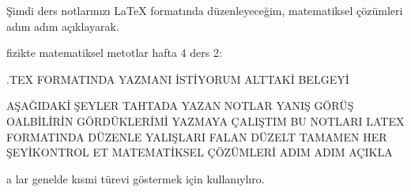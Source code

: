 Şimdi ders notlarınızı LaTeX formatında düzenleyeceğim, matematiksel çözümleri adım adım açıklayarak.


fizikte matematiksel metotlar hafta 4 ders 2:

.TEX FORMATINDA YAZMANI İSTİYORUM ALTTAKİ BELGEYİ

AŞAĞIDAKİ ŞEYLER TAHTADA YAZAN NOTLAR YANIŞ GÖRÜŞ OALBİLİRİN GÖRDÜKLERİMİ YAZMAYA ÇALIŞTIM
BU NOTLARI LATEX FORMATINDA DÜZENLE YALIŞLARI FALAN DÜZELT TAMAMEN HER ŞEYİKONTROL ET MATEMATİKSEL ÇÖZÜMLERİ ADIM ADIM AÇIKLA

a lar genelde kısmi türevi göstermek için kullanıylıro.